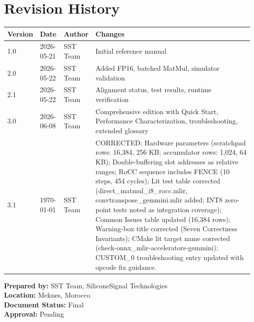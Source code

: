 \documentclass[12pt,a4paper]{article}
\begin{document}
\section*{Revision History}

\begin{tabular}{|p{}|p{}|p{}|p{}|}
\hline
\textbf{Version} & \textbf{Date} & \textbf{Author} & \textbf{Changes} \\
\hline
1.0 & 2026-05-21 & SST Team & Initial reference manual \\
\hline
2.0 & 2026-05-22 & SST Team & Added FP16, batched MatMul, simulator validation \\
\hline
2.1 & 2026-05-22 & SST Team & Alignment status, test results, runtime verification \\
\hline
3.0 & 2026-06-08 & SST Team & Comprehensive edition with Quick Start, Performance Characterization, troubleshooting, extended glossary \\
\hline
3.1 & \today & SST Team & CORRECTED: Hardware parameters (scratchpad rows: 16,384, 256 KB; accumulator rows: 1,024, 64 KB); Double-buffering slot addresses as relative ranges; RoCC sequence includes FENCE (10 steps, 454 cycles); Lit test table corrected (direct\_matmul\_i8\_rocc.mlir, convtranspose\_gemmini.mlir added; INT8 zero-point tests noted as integration coverage); Common Issues table updated (16,384 rows); Warning-box title corrected (Seven Correctness Invariants); CMake lit target name corrected (check-onnx\_mlir-accelerators-gemmini); CUSTOM\_0 troubleshooting entry updated with opcode fix guidance. \\
\hline
\end{tabular}

\vspace{1cm}

\noindent\textbf{Prepared by:} SST Team, SiliconeSignal Technologies \\
\noindent\textbf{Location:} Meknes, Morocco \\
\noindent\textbf{Document Status:} Final \\
\noindent\textbf{Approval:} Pending
\end{document}
